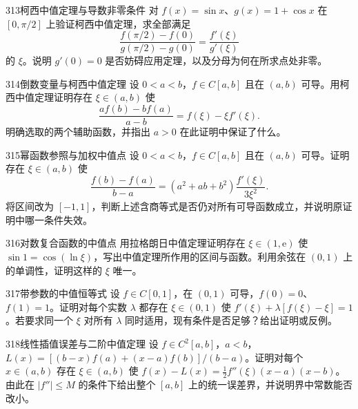 \begin{exercise}{313}{柯西中值定理与导数非零条件}
对 $f(x)=\sin x$、$g(x)=1+\cos x$ 在 $[0,\pi/2]$ 上验证柯西中值定理，求全部满足
\[\frac{f(\pi/2)-f(0)}{g(\pi/2)-g(0)}=\frac{f'(\xi)}{g'(\xi)}\]
的 $\xi$。说明 $g'(0)=0$ 是否妨碍应用定理，以及分母为何在所求点处非零。
\end{exercise}
\begin{exercise}{314}{倒数变量与柯西中值定理}
设 $0<a<b$，$f\in C[a,b]$ 且在 $(a,b)$ 可导。用柯西中值定理证明存在 $\xi\in(a,b)$ 使
\[\frac{af(b)-bf(a)}{a-b}=f(\xi)-\xi f'(\xi).\]
明确选取的两个辅助函数，并指出 $a>0$ 在此证明中保证了什么。
\end{exercise}
\begin{exercise}{315}{幂函数参照与加权中值点}
设 $0<a<b$，$f\in C[a,b]$ 且在 $(a,b)$ 可导。证明存在 $\xi\in(a,b)$ 使
\[\frac{f(b)-f(a)}{b-a}=(a^2+ab+b^2)\frac{f'(\xi)}{3\xi^2}.\]
将区间改为 $[-1,1]$，判断上述含商等式是否仍对所有可导函数成立，并说明原证明中哪一条件失效。
\end{exercise}
\begin{exercise}{316}{对数复合函数的中值点}
用拉格朗日中值定理证明存在 $\xi\in(1,\mathrm e)$ 使 $\sin1=\cos(\ln\xi)$，写出中值定理所作用的区间与函数。利用余弦在 $(0,1)$ 上的单调性，证明这样的 $\xi$ 唯一。
\end{exercise}
\begin{exercise}{317}{带参数的中值恒等式}
设 $f\in C[0,1]$，在 $(0,1)$ 可导，$f(0)=0$、$f(1)=1$。证明对每个实数 $\lambda$ 都存在 $\xi\in(0,1)$ 使 $f'(\xi)+\lambda[f(\xi)-\xi]=1$。若要求同一个 $\xi$ 对所有 $\lambda$ 同时适用，现有条件是否足够？给出证明或反例。
\end{exercise}
\begin{exercise}{318}{线性插值误差与二阶中值定理}
设 $f\in C^2[a,b]$，$a<b$，$L(x)=[(b-x)f(a)+(x-a)f(b)]/(b-a)$。证明对每个 $x\in(a,b)$ 存在 $\xi\in(a,b)$ 使 $f(x)-L(x)=\tfrac12f''(\xi)(x-a)(x-b)$。由此在 $|f''|\le M$ 的条件下给出整个 $[a,b]$ 上的统一误差界，并说明界中常数能否改小。
\end{exercise}
